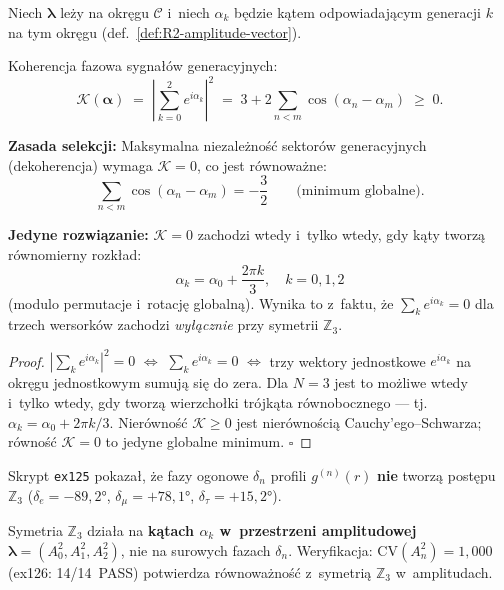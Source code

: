 \begin{proposition}%
\label{prop:R2-decoherence-Z3}
Niech $\boldsymbol{\lambda}$ le\.zy na okr\k{e}gu $\mathcal{C}$
i~niech $\alpha_k$ b\k{e}dzie k\k{a}tem odpowiadaj\k{a}cym
generacji $k$ na tym okr\k{e}gu (def.~\ref{def:R2-amplitude-vector}).

Koherencja fazowa sygna\l{}\'ow generacyjnych:
\begin{equation}\label{eq:R2-coherence}
  \mathcal{K}(\boldsymbol{\alpha})
  \;=\; \left|\sum_{k=0}^{2} e^{i\alpha_k}\right|^2
  \;=\; 3 + 2\sum_{n<m}\cos(\alpha_n - \alpha_m)
  \;\geq\; 0.
\end{equation}

\textbf{Zasada selekcji:} Maksymalna niezale\.zno\'s\'c
sektor\'ow generacyjnych (dekoherencja) wymaga
$\mathcal{K} = 0$, co jest r\'ownowa\.zne:
\begin{equation}\label{eq:R2-decoherence-condition}
  \sum_{n<m}\cos(\alpha_n - \alpha_m) = -\frac{3}{2}
  \qquad\text{(minimum globalne).}
\end{equation}

\medskip\noindent
\textbf{Jedyne rozwi\k{a}zanie:}
$\mathcal{K} = 0$ zachodzi wtedy i~tylko wtedy, gdy
k\k{a}ty tworz\k{a} r\'ownomierny rozk\l{}ad:
\begin{equation}\label{eq:R2-Z3-phases}
  \alpha_k = \alpha_0 + \frac{2\pi k}{3},
  \quad k = 0, 1, 2
\end{equation}
(modulo permutacje i~rotacj\k{e} globaln\k{a}).
Wynika to z~faktu, \.ze $\sum_k e^{i\alpha_k} = 0$
dla trzech wersork\'ow zachodzi \emph{wy\l{}\k{a}cznie}
przy symetrii $\mathbb{Z}_3$.

\begin{proof}
$|\sum_k e^{i\alpha_k}|^2 = 0$
$\Leftrightarrow$
$\sum_k e^{i\alpha_k} = 0$
$\Leftrightarrow$
trzy wektory jednostkowe $e^{i\alpha_k}$ na okr\k{e}gu
jednostkowym sumuj\k{a} si\k{e} do zera.
Dla $N=3$ jest to mo\.zliwe wtedy i~tylko wtedy,
gdy tworz\k{a} wierzcho\l{}ki tr\'ojk\k{a}ta r\'owno\-bocznego
--- tj.~$\alpha_k = \alpha_0 + 2\pi k/3$.
Nier\'owno\'s\'c $\mathcal{K} \geq 0$
jest nier\'owno\'sci\k{a} Cauchy'ego--Schwarza;
r\'owno\'s\'c $\mathcal{K} = 0$ to jedyne
globalne minimum.
\hfill$\square$
\end{proof}
\end{proposition}

\begin{remark}%
\label{rem:R2-phase-correction}
Skrypt \texttt{ex125} pokaza\l{}, \.ze fazy ogonowe
$\delta_n$ profili $g^{(n)}(r)$ \textbf{nie} tworz\k{a}
post\k{e}pu $\mathbb{Z}_3$
($\delta_e = -89{,}2°$, $\delta_\mu = +78{,}1°$,
$\delta_\tau = +15{,}2°$).

Symetria $\mathbb{Z}_3$ działa na \textbf{k\k{a}tach
$\alpha_k$ w~przestrzeni amplitudowej}
$\boldsymbol{\lambda} = (A_0^2, A_1^2, A_2^2)$,
nie na surowych fazach $\delta_n$.
Weryfikacja: $\mathrm{CV}(A_n^2) = 1{,}000$
(ex126: 14/14~PASS) potwierdza r\'ownowa\.zno\'s\'c
z~symetri\k{a} $\mathbb{Z}_3$ w~amplitudach.
\end{remark}

